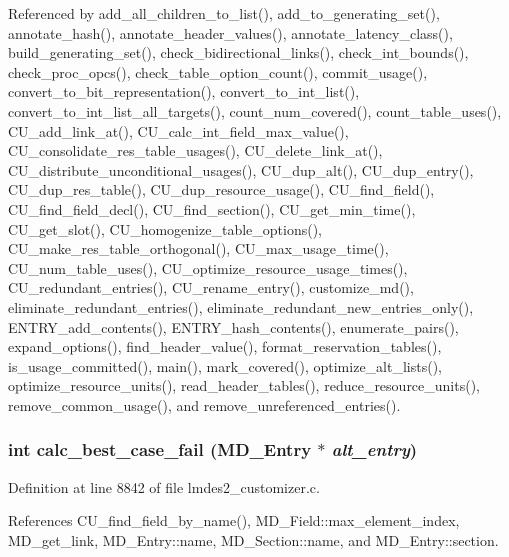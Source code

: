 Referenced by add\_\-all\_\-children\_\-to\_\-list(), add\_\-to\_\-generating\_\-set(), annotate\_\-hash(), annotate\_\-header\_\-values(), annotate\_\-latency\_\-class(), build\_\-generating\_\-set(), check\_\-bidirectional\_\-links(), check\_\-int\_\-bounds(), check\_\-proc\_\-opcs(), check\_\-table\_\-option\_\-count(), commit\_\-usage(), convert\_\-to\_\-bit\_\-representation(), convert\_\-to\_\-int\_\-list(), convert\_\-to\_\-int\_\-list\_\-all\_\-targets(), count\_\-num\_\-covered(), count\_\-table\_\-uses(), CU\_\-add\_\-link\_\-at(), CU\_\-calc\_\-int\_\-field\_\-max\_\-value(), CU\_\-consolidate\_\-res\_\-table\_\-usages(), CU\_\-delete\_\-link\_\-at(), CU\_\-distribute\_\-unconditional\_\-usages(), CU\_\-dup\_\-alt(), CU\_\-dup\_\-entry(), CU\_\-dup\_\-res\_\-table(), CU\_\-dup\_\-resource\_\-usage(), CU\_\-find\_\-field(), CU\_\-find\_\-field\_\-decl(), CU\_\-find\_\-section(), CU\_\-get\_\-min\_\-time(), CU\_\-get\_\-slot(), CU\_\-homogenize\_\-table\_\-options(), CU\_\-make\_\-res\_\-table\_\-orthogonal(), CU\_\-max\_\-usage\_\-time(), CU\_\-num\_\-table\_\-uses(), CU\_\-optimize\_\-resource\_\-usage\_\-times(), CU\_\-redundant\_\-entries(), CU\_\-rename\_\-entry(), customize\_\-md(), eliminate\_\-redundant\_\-entries(), eliminate\_\-redundant\_\-new\_\-entries\_\-only(), ENTRY\_\-add\_\-contents(), ENTRY\_\-hash\_\-contents(), enumerate\_\-pairs(), expand\_\-options(), find\_\-header\_\-value(), format\_\-reservation\_\-tables(), is\_\-usage\_\-committed(), main(), mark\_\-covered(), optimize\_\-alt\_\-lists(), optimize\_\-resource\_\-units(), read\_\-header\_\-tables(), reduce\_\-resource\_\-units(), remove\_\-common\_\-usage(), and remove\_\-unreferenced\_\-entries().
\subsubsection{\setlength{\rightskip}{0pt plus 5cm}int calc\_\-best\_\-case\_\-fail (\bf{MD\_\-Entry} $\ast$ {\em alt\_\-entry})}\label{lmdes2__customizer_8c_ceb3d2d68fbf7f1698accb82d5742719}




Definition at line 8842 of file lmdes2\_\-customizer.c.

References CU\_\-find\_\-field\_\-by\_\-name(), MD\_\-Field::max\_\-element\_\-index, MD\_\-get\_\-link, MD\_\-Entry::name, MD\_\-Section::name, and MD\_\-Entry::section.

